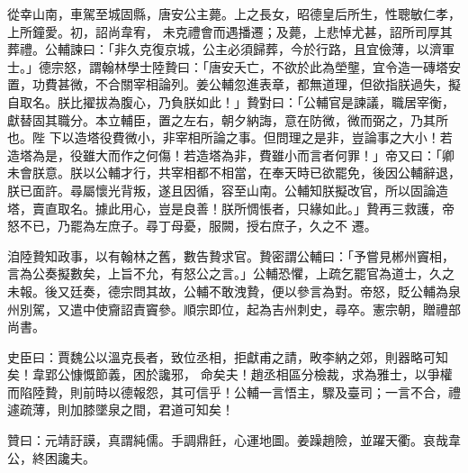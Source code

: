 \begin{pinyinscope}
 從幸山南，車駕至城固縣，唐安公主薨。上之長女，昭德皇后所生，性聰敏仁孝，上所鐘愛。初，詔尚韋宥，
 未克禮會而遇播遷；及薨，上悲悼尤甚，詔所司厚其葬禮。公輔諫曰：「非久克復京城，公主必須歸葬，今於行路，且宜儉薄，以濟軍士。」德宗怒，謂翰林學士陸贄曰：「唐安夭亡，不欲於此為塋壟，宜令造一磚塔安置，功費甚微，不合關宰相論列。姜公輔忽進表章，都無道理，但欲指朕過失，擬自取名。朕比擢拔為腹心，乃負朕如此！」贄對曰：「公輔官是諫議，職居宰衡，獻替固其職分。本立輔臣，置之左右，朝夕納誨，意在防微，微而弼之，乃其所也。陛
 下以造塔役費微小，非宰相所論之事。但問理之是非，豈論事之大小！若造塔為是，役雖大而作之何傷！若造塔為非，費雖小而言者何罪！」帝又曰：「卿未會朕意。朕以公輔才行，共宰相都不相當，在奉天時已欲罷免，後因公輔辭退，朕已面許。尋屬懷光背叛，遂且因循，容至山南。公輔知朕擬改官，所以固論造塔，賣直取名。據此用心，豈是良善！朕所惆悵者，只緣如此。」贄再三救護，帝怒不已，乃罷為左庶子。尋丁母憂，服闕，授右庶子，久之不
 遷。



 洎陸贄知政事，以有翰林之舊，數告贄求官。贄密謂公輔曰：「予嘗見郴州竇相，言為公奏擬數矣，上旨不允，有怒公之言。」公輔恐懼，上疏乞罷官為道士，久之未報。後又廷奏，德宗問其故，公輔不敢洩贄，便以參言為對。帝怒，貶公輔為泉州別駕，又遣中使齎詔責竇參。順宗即位，起為吉州刺史，尋卒。憲宗朝，贈禮部尚書。



 史臣曰：賈魏公以溫克長者，致位丞相，拒獻甫之請，畋李納之郊，則器略可知矣！韋郢公慷慨節義，困於讒邪，
 命矣夫！趙丞相區分檢裁，求為雅士，以爭權而陷陸贄，則前時以德報怨，其可信乎！公輔一言悟主，驟及臺司；一言不合，禮遽疏薄，則加膝墜泉之間，君道可知矣！



 贊曰：元靖訏謨，真謂純儒。手調鼎飪，心運地圖。姜躁趙險，並躍天衢。哀哉韋公，終困讒夫。



\end{pinyinscope}